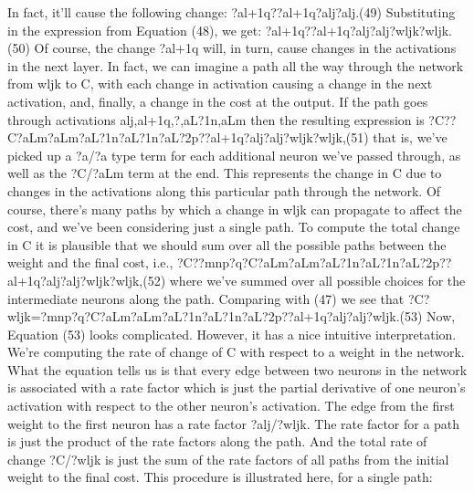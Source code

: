 In fact, it'll cause the following change: 
?al+1q??al+1q?alj?alj.(49)
Substituting in the expression from Equation (48), we get: 
?al+1q??al+1q?alj?alj?wljk?wljk.(50)
Of course, the change ?al+1q will, in turn, cause changes in the activations in the next layer. In fact, we can imagine a path all the way through the network from wljk to C, with each change in activation causing a change in the next activation, and, finally, a change in the cost at the output. If the path goes through activations alj,al+1q,?,aL?1n,aLm then the resulting expression is 
?C??C?aLm?aLm?aL?1n?aL?1n?aL?2p??al+1q?alj?alj?wljk?wljk,(51)
that is, we've picked up a ?a/?a type term for each additional neuron we've passed through, as well as the ?C/?aLm term at the end. This represents the change in C due to changes in the activations along this particular path through the network. Of course, there's many paths by which a change in wljk can propagate to affect the cost, and we've been considering just a single path. To compute the total change in C it is plausible that we should sum over all the possible paths between the weight and the final cost, i.e., 
?C??mnp?q?C?aLm?aLm?aL?1n?aL?1n?aL?2p??al+1q?alj?alj?wljk?wljk,(52)
where we've summed over all possible choices for the intermediate neurons along the path. Comparing with (47) we see that 
?C?wljk=?mnp?q?C?aLm?aLm?aL?1n?aL?1n?aL?2p??al+1q?alj?alj?wljk.(53)
Now, Equation (53) looks complicated. However, it has a nice intuitive interpretation. We're computing the rate of change of C with respect to a weight in the network. What the equation tells us is that every edge between two neurons in the network is associated with a rate factor which is just the partial derivative of one neuron's activation with respect to the other neuron's activation. The edge from the first weight to the first neuron has a rate factor ?alj/?wljk. The rate factor for a path is just the product of the rate factors along the path. And the total rate of change ?C/?wljk is just the sum of the rate factors of all paths from the initial weight to the final cost. This procedure is illustrated here, for a single path: 

